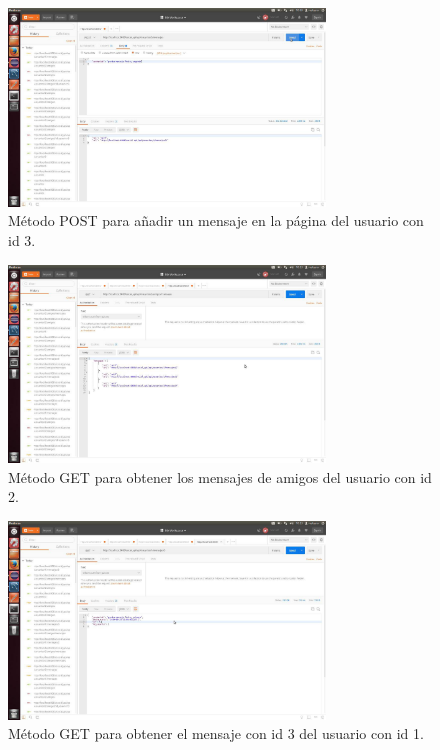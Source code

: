 \documentclass[12pt,a4paper, spanish]{article}
\begin{document}
\begin{figure}[H]
	\centering
	\includegraphics[width=0.75\textwidth]{images/captura22.jpg}
	\caption{Método POST para añadir un mensaje en la página del usuario con id 3.}
\end{figure}

\begin{figure}[H]
	\centering
	\includegraphics[width=0.75\textwidth]{images/captura23.jpg}
	\caption{Método GET para obtener los mensajes de amigos del usuario con id 2.}
\end{figure}

\begin{figure}[H]
	\centering
	\includegraphics[width=0.75\textwidth]{images/captura24.jpg}
	\caption{Método GET para obtener el mensaje con id 3 del usuario con id 1.}
\end{figure}
\end{document}
